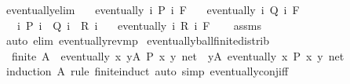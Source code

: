 \begin{isabellebody}
\endisatagproof
{\isafoldproof}%
%
\isadelimproof
\isanewline
%
\endisadelimproof
\isanewline
{}\isamarkupfalse%
\ eventually{\isacharunderscore}{\kern0pt}elim{}{\isacharcolon}{\kern0pt}\isanewline
\ \ \ {\isachardoublequoteopen}eventually\ {\isacharparenleft}{\kern0pt}{\isasymlambda}i{\isachardot}{\kern0pt}\ P\ i{\isacharparenright}{\kern0pt}\ F{\isachardoublequoteclose}\isanewline
\ \ \ {\isachardoublequoteopen}eventually\ {\isacharparenleft}{\kern0pt}{\isasymlambda}i{\isachardot}{\kern0pt}\ Q\ i{\isacharparenright}{\kern0pt}\ F{\isachardoublequoteclose}\isanewline
\ \ \ {\isachardoublequoteopen}{\isasymAnd}i{\isachardot}{\kern0pt}\ P\ i\ {\isasymLongrightarrow}\ Q\ i\ {\isasymLongrightarrow}\ R\ i{\isachardoublequoteclose}\isanewline
\ \ \ {\isachardoublequoteopen}eventually\ {\isacharparenleft}{\kern0pt}{\isasymlambda}i{\isachardot}{\kern0pt}\ R\ i{\isacharparenright}{\kern0pt}\ F{\isachardoublequoteclose}\isanewline
%
\isadelimproof
\ \ %
\endisadelimproof
%
\isatagproof
{}\isamarkupfalse%
\ assms\ \isamarkupfalse%
\ {\isacharparenleft}{\kern0pt}auto\ elim{\isacharbang}{\kern0pt}{\isacharcolon}{\kern0pt}\ eventually{\isacharunderscore}{\kern0pt}rev{\isacharunderscore}{\kern0pt}mp{\isacharparenright}{\kern0pt}%
\endisatagproof
{\isafoldproof}%
%
\isadelimproof
\isanewline
%
\endisadelimproof
\isanewline
{}\isamarkupfalse%
\ eventually{\isacharunderscore}{\kern0pt}ball{\isacharunderscore}{\kern0pt}finite{\isacharunderscore}{\kern0pt}distrib{\isacharcolon}{\kern0pt}\isanewline
\ \ {\isachardoublequoteopen}finite\ A\ {\isasymLongrightarrow}\ {\isacharparenleft}{\kern0pt}eventually\ {\isacharparenleft}{\kern0pt}{\isasymlambda}x{\isachardot}{\kern0pt}\ {\isasymforall}y{\isasymin}A{\isachardot}{\kern0pt}\ P\ x\ y{\isacharparenright}{\kern0pt}\ net{\isacharparenright}{\kern0pt}\ {\isasymlongleftrightarrow}\ {\isacharparenleft}{\kern0pt}{\isasymforall}y{\isasymin}A{\isachardot}{\kern0pt}\ eventually\ {\isacharparenleft}{\kern0pt}{\isasymlambda}x{\isachardot}{\kern0pt}\ P\ x\ y{\isacharparenright}{\kern0pt}\ net{\isacharparenright}{\kern0pt}{\isachardoublequoteclose}\isanewline
%
\isadelimproof
\ \ %
\endisadelimproof
%
\isatagproof
{}\isamarkupfalse%
\ {\isacharparenleft}{\kern0pt}induction\ A\ rule{\isacharcolon}{\kern0pt}\ finite{\isacharunderscore}{\kern0pt}induct{\isacharparenright}{\kern0pt}\ {\isacharparenleft}{\kern0pt}auto\ simp{\isacharcolon}{\kern0pt}\ eventually{\isacharunderscore}{\kern0pt}conj{\isacharunderscore}{\kern0pt}iff{\isacharparenright}{\kern0pt}%

\end{isabellebody}
